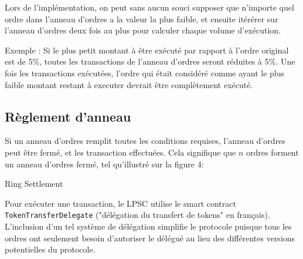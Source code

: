 \documentclass[UTF8,nofonts]{article}
\makeatletter
\newenvironment{figurehere}
 {\def\@captype{figure}}
 {}
\makeatother
\begin{document}
\begin{multicols}{2}
Lors de l'implémentation, on peut sans aucun souci supposer que n'importe quel ordre dans l'anneau d'ordres a la valeur la plus faible, et ensuite itérérer sur l'anneau d'ordres deux fois au plus pour calculer chaque volume d'exécution.

Exemple : Si le plus petit montant à être exécuté par rapport à l'ordre original est de 5\%, toutes les transactions de l'anneau d'ordres seront réduites à 5\%. Une fois les transactions exécutées, l'ordre qui était considéré comme ayant le plus faible montant restant à executer devrait être complètement exécuté.

\subsection{Règlement d'anneau\label{sec:settlement}}

Si un anneau d'ordres remplit toutes les conditions requises, l'anneau d'ordres peut être fermé, et les transaction effectuées. Cela signifique que $n$ ordres forment un anneau d'ordres fermé, tel qu'illustré sur la figure 4:

\begin{center}
\begin{figurehere}
\centering
{}
\caption{Ring Settlement}
\label{fig:settlement}
\end{figurehere}
\end{center}

Pour exécuter une transaction, le LPSC utilise le smart contract \verb|TokenTransferDelegate| ("délégation du transfert de tokens" en français). L'inclusion d'un tel système de délégation simplifie le protocole puisque tous les ordres ont seulement besoin d'autoriser le délégué au lieu des différentes versions potentielles du protocole.


\end{multicols}
\end{document}
